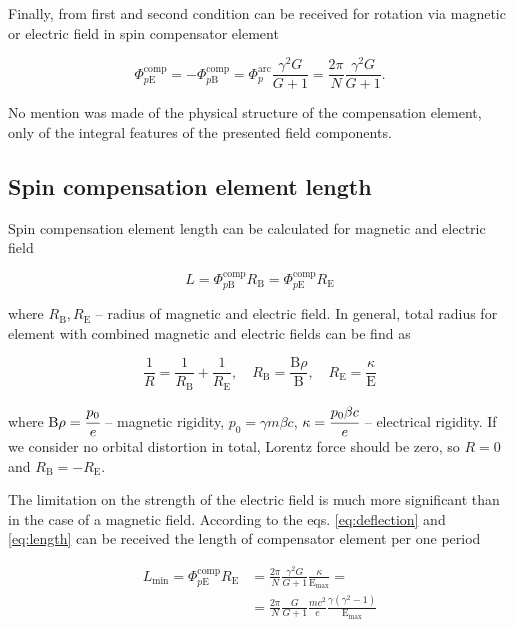 \documentclass[submitting]{nst}
\begin{document}
 \par Finally, from first and second condition can be received for rotation via magnetic or electric field in spin compensator element

\begin{equation}
	\Phi_{p\mathrm{E}}^{\textrm{comp}} = - \Phi_{p\mathrm{B}}^{\textrm{comp}} = {\Phi}_{p}^{\text{arc}}\frac{\gamma^2 G}{G+1} =\frac{2\pi}{N}\frac{\gamma^2 G}{G+1}.
	\label{eq:deflection}
\end{equation}

\noindent No mention was made of the physical structure of the compensation element, only of the integral features of the presented field components.

\subsection{Spin compensation element length}

Spin compensation element length can be calculated for magnetic and electric field

\begin{equation}
	L = \Phi_{p\mathrm{B}}^{\text{comp}}R_{\mathrm{B}} = \Phi_{p\mathrm{E}}^{\text{comp}}R_{\mathrm{E}}
	\label{eq:length}
\end{equation}

\noindent where $R_{\mathrm{B}}, R_{\mathrm{E}}$ -- radius of magnetic and electric field. In general, total radius for element with combined magnetic and electric fields can be find as

\begin{equation}
	\frac{1}{R} = \frac{1}{R_{\mathrm{B}}}+\frac{1}{R_{\mathrm{E}}}, \quad R_{\mathrm{B}}=\frac{\mathrm{B}\rho}{\mathrm{B}}, \quad R_{\mathrm{E}}=\frac{\kappa}{\mathrm{E}}    
	\label{eq:total_radius}
\end{equation}

\noindent where $\mathrm{B}\rho = \cfrac{p_{0}}{e}$ -- magnetic rigidity, $p_{0} = \gamma m\beta c$, $\kappa = \cfrac{p_{0}\beta c}{e}$ -- electrical rigidity. If we consider no orbital distortion in total, Lorentz force should be zero, so $R=0$ and $R_{\mathrm{B}} = -R_{\mathrm{E}}$.

The limitation on the strength of the electric field is much more significant than in the case of a magnetic field. According to the eqs. \ref{eq:deflection} and \ref{eq:length} can be received the length of compensator element per one period

\begin{equation}
	\begin{aligned}
	L_{\text{min}} = \Phi_{p\mathrm{E}}^{\text{comp}}R_{\mathrm{E}} & = 
	\frac{2\pi}{N}\frac{\gamma^2 G}{G+1}\frac{\kappa}{\mathrm{E}_{\text{max}}} = \\
	& = \frac{2\pi}{N}\frac{G}{G+1}\frac{mc^2}{e}\frac{\gamma(\gamma^2-1)}{\mathrm{E}_{\text{max}}}
	\label{eq:length_min}
	\end{aligned}
\end{equation}
\end{document}
